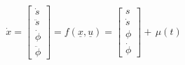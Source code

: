 \begin{equation}\label{fofx}
    \dot{x}=\begin{bmatrix}\dot{s} \\ \ddot{s} \\ \dot{\phi} \\ \ddot{\phi}\end{bmatrix} = f(\underline{x},\underline{u}) =  \begin{bmatrix} s \\ \dot{s} \\ \phi \\ \dot{\phi}\end{bmatrix} + \,\mu(t)
\end{equation}